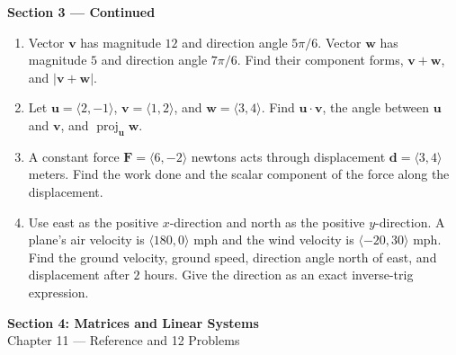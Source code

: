 \documentclass[11pt]{article}
\begin{document}
\newpage
\begin{center}{\large\textbf{Section 3 --- Continued}}\end{center}
\begin{enumerate}[leftmargin=*,itemsep=0pt,resume=chapterNine]
  \item Vector $\mathbf v$ has magnitude $12$ and direction angle $5\pi/6$.
  Vector $\mathbf w$ has magnitude $5$ and direction angle $7\pi/6$.
  Find their component forms, $\mathbf v+\mathbf w$, and $|\mathbf v+\mathbf w|$.
  \par{}

  \item Let $\mathbf u=\langle2,-1\rangle$, $\mathbf v=\langle1,2\rangle$,
  and $\mathbf w=\langle3,4\rangle$. Find $\mathbf u\cdot\mathbf v$, the angle
  between $\mathbf u$ and $\mathbf v$, and
  $\operatorname{proj}_{\mathbf u}\mathbf w$.
  \par{}

  \item A constant force $\mathbf F=\langle6,-2\rangle$ newtons acts through
  displacement $\mathbf d=\langle3,4\rangle$ meters. Find the work done and
  the scalar component of the force along the displacement.
  \par{}

  \item Use east as the positive $x$-direction and north as the positive
  $y$-direction. A plane's air velocity is $\langle180,0\rangle$ mph and the
  wind velocity is $\langle-20,30\rangle$ mph. Find the ground velocity,
  ground speed, direction angle north of east, and displacement after
  $2$ hours. Give the direction as an exact inverse-trig expression.
  \par{}
\end{enumerate}

\newpage
\begin{center}
  {\Large\textbf{Section 4: Matrices and Linear Systems}}\\[3pt]
  Chapter 11 --- Reference and 12 Problems
\end{center}
\end{document}
